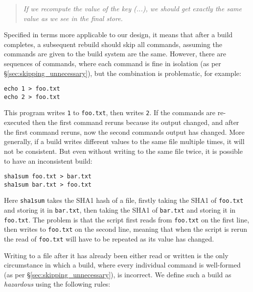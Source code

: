 \begin{quote}
\emph{If we recompute the value of the key (...), we should get exactly the same value as we see in the final store.}
\end{quote}

Specified in terms more applicable to our design, it means that after a build completes, a subsequent rebuild should skip all commands, assuming the commands are given to the build system are the same. However, there are sequences of commands, where each command is fine in isolation (as per \S\ref{sec:skipping_unnecessary}), but the combination is problematic, for example:

\vspace{1mm}
\begin{verbatim}
echo 1 > foo.txt
echo 2 > foo.txt
\end{verbatim}
\vspace{1mm}

This program writes \texttt{1} to \texttt{foo.txt}, then writes \texttt{2}. If the commands are re-executed then the first command reruns because its output changed, and after the first command reruns, now the second commands output has changed. More generally, if a build writes different values to the same file multiple times, it will not be consistent. But even without writing to the same file twice, it is possible to have an inconsistent build:

\vspace{1mm}
\begin{verbatim}
sha1sum foo.txt > bar.txt
sha1sum bar.txt > foo.txt
\end{verbatim}
\vspace{1mm}

Here \texttt{sha1sum} takes the SHA1 hash of a file, firstly taking the SHA1 of \texttt{foo.txt} and storing it in \texttt{bar.txt}, then taking the SHA1 of \texttt{bar.txt} and storing it in \texttt{foo.txt}. The problem is that the script first reads from \texttt{foo.txt} on the first line, then writes to \texttt{foo.txt} on the second line, meaning that when the script is rerun the read of \texttt{foo.txt} will have to be repeated as its value has changed.

Writing to a file after it has already been either read or written is the only circumstance in which a build, where every individual command is well-formed (as per \S\ref{sec:skipping_unnecessary}), is incorrect. We define such a build as \emph{hazardous} using the following rules:

